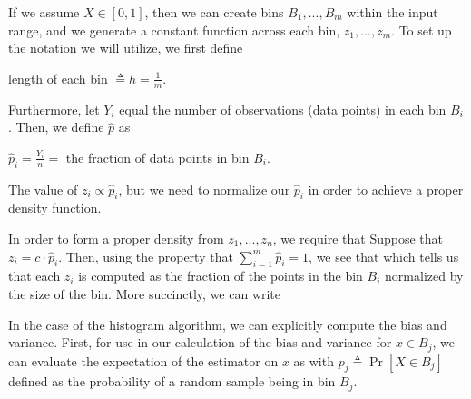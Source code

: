 If we assume $X \in \left[0,1\right]$, then we can create bins $B_1, ..., B_m$ within the input range, and we generate a constant function across each bin, $z_1, ..., z_m$. To set up the notation we will utilize, we first define 
\begin{center}
	length of each bin $\triangleq h = \frac{1}{m}$.
\end{center}
Furthermore, let $Y_i$ equal the number of observations (data points) in each bin $B_i$. Then, we define $\hat{p}$ as
\begin{center}
	$\hat{p}_i = \frac{Y_i}{n} = $ the fraction of data points in bin $B_i$.
\end{center} 
The value of $z_i \propto \hat{p}_i$, but we need to normalize our $\hat{p}_i$ in order to achieve a proper density function.

In order to form a proper density from $z_1, ..., z_n$, we require that 
Suppose that $z_i = c \cdot \hat{p}_i$. Then, using the property that $\sum\limits_{i=1}^m\hat{p}_i = 1$, we see that
which tells us that each $z_i$ is computed as the fraction of the points in the bin $B_i$ normalized by the size of the bin. 
More succinctly, we can write



In the case of the histogram algorithm, we can explicitly compute the bias and variance. First, for use in our calculation of the bias and variance for $x \in B_j$, we can evaluate the expectation of the estimator on $x$ as
with $p_j \triangleq \Pr\left[X \in B_j \right]$ defined as the probability of a random sample being in bin $B_j$.

